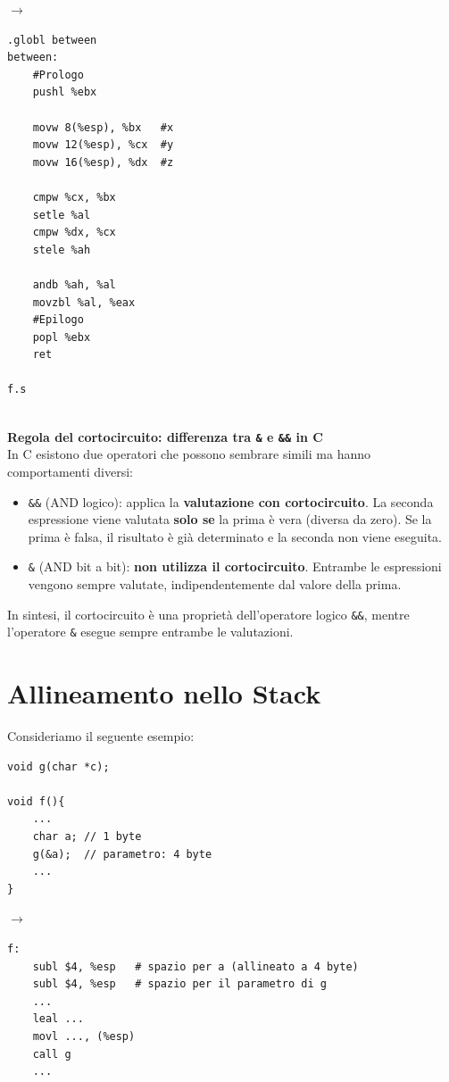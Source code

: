 \hfill
$\longrightarrow$
\hfill
\begin{minipage}{0.4\textwidth}
    \begin{verbatim}
.globl between
between:
    #Prologo
    pushl %ebx

    movw 8(%esp), %bx   #x
    movw 12(%esp), %cx  #y
    movw 16(%esp), %dx  #z

    cmpw %cx, %bx
    setle %al
    cmpw %dx, %cx
    stele %ah

    andb %ah, %al
    movzbl %al, %eax
    #Epilogo
    popl %ebx
    ret

f.s
    \end{verbatim}
\end{minipage}\medskip\\
\textbf{Regola del cortocircuito: differenza tra \texttt{\&} e \texttt{\&\&} in C}\\
In C esistono due operatori che possono sembrare simili ma hanno comportamenti diversi:
\begin{itemize}
    \item \texttt{\&\&} (AND logico): applica la \textbf{valutazione con cortocircuito}. La seconda espressione viene valutata \textbf{solo se} la prima è vera (diversa da zero). Se la prima è falsa, il risultato è già determinato e la seconda non viene eseguita.
    \item \texttt{\&} (AND bit a bit): \textbf{non utilizza il cortocircuito}. Entrambe le espressioni vengono sempre valutate, indipendentemente dal valore della prima.
\end{itemize}
In sintesi, il cortocircuito è una proprietà dell'operatore logico \texttt{\&\&}, mentre l'operatore \texttt{\&} esegue sempre entrambe le valutazioni.\\
\section{Allineamento nello Stack}

Consideriamo il seguente esempio:\medskip\\

\begin{minipage}{0.4\textwidth}
\begin{verbatim}
void g(char *c);

void f(){
    ...
    char a; // 1 byte
    g(&a);  // parametro: 4 byte
    ...
}
\end{verbatim}
\end{minipage}
\hfill
$\longrightarrow$
\hfill
\begin{minipage}{0.5\textwidth}
\begin{verbatim}
f:
    subl $4, %esp   # spazio per a (allineato a 4 byte)
    subl $4, %esp   # spazio per il parametro di g
    ...
    leal ...
    movl ..., (%esp)
    call g
    ...
\end{verbatim}
\end{minipage}

